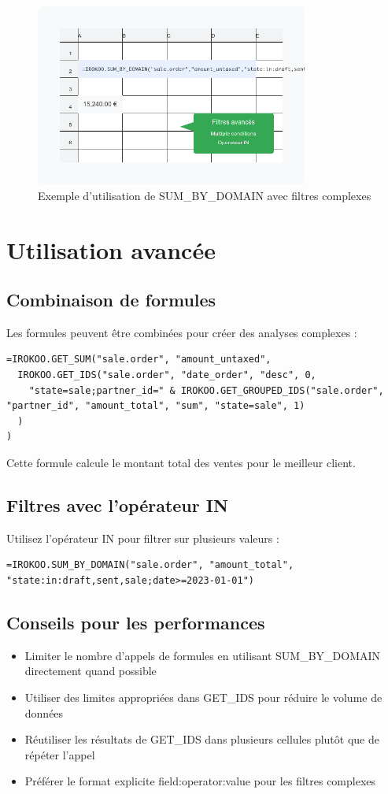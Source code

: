 \documentclass[12pt, a4paper]{article}
\begin{document}
\begin{figure}[H]
    \centering
    \includegraphics[width=0.8\textwidth]{feature2.png}
    \caption{Exemple d'utilisation de SUM\_BY\_DOMAIN avec filtres complexes}
\end{figure}

\section{Utilisation avancée}

\subsection{Combinaison de formules}
Les formules peuvent être combinées pour créer des analyses complexes :
\begin{lstlisting}
=IROKOO.GET_SUM("sale.order", "amount_untaxed", 
  IROKOO.GET_IDS("sale.order", "date_order", "desc", 0, 
    "state=sale;partner_id=" & IROKOO.GET_GROUPED_IDS("sale.order", "partner_id", "amount_total", "sum", "state=sale", 1)
  )
)
\end{lstlisting}
Cette formule calcule le montant total des ventes pour le meilleur client.

\subsection{Filtres avec l'opérateur IN}
Utilisez l'opérateur IN pour filtrer sur plusieurs valeurs :
\begin{lstlisting}
=IROKOO.SUM_BY_DOMAIN("sale.order", "amount_total", "state:in:draft,sent,sale;date>=2023-01-01")
\end{lstlisting}

\subsection{Conseils pour les performances}
\begin{itemize}
    \item Limiter le nombre d'appels de formules en utilisant SUM\_BY\_DOMAIN directement quand possible
    \item Utiliser des limites appropriées dans GET\_IDS pour réduire le volume de données
    \item Réutiliser les résultats de GET\_IDS dans plusieurs cellules plutôt que de répéter l'appel
    \item Préférer le format explicite field:operator:value pour les filtres complexes
\end{itemize}
\end{document}
